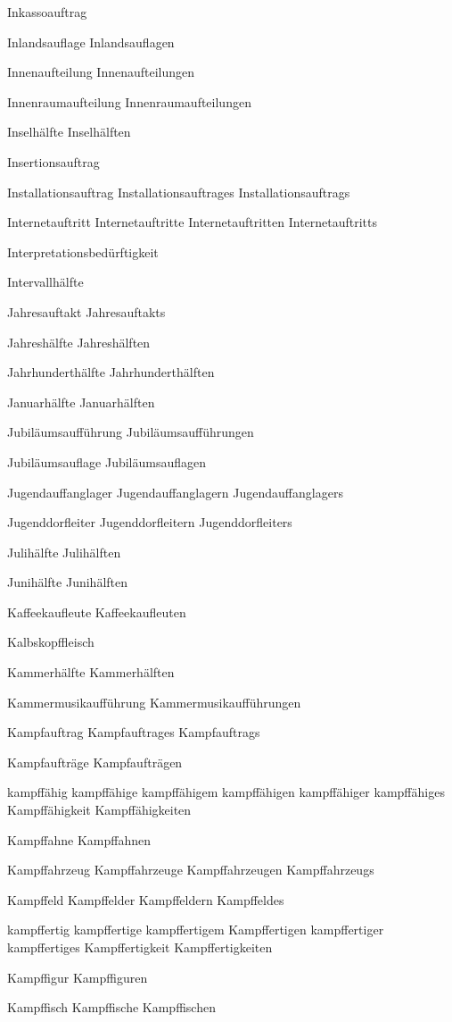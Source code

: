 Inkassoauftrag

Inlandsauflage
Inlandsauflagen

Innenaufteilung
Innenaufteilungen

Innenraumaufteilung
Innenraumaufteilungen

Inselhälfte
Inselhälften

Insertionsauftrag

Installationsauftrag
Installationsauftrages
Installationsauftrags

Internetauftritt
Internetauftritte
Internetauftritten
Internetauftritts

Interpretationsbedürftigkeit

Intervallhälfte

Jahresauftakt
Jahresauftakts

Jahreshälfte
Jahreshälften

Jahrhunderthälfte
Jahrhunderthälften

Januarhälfte
Januarhälften

Jubiläumsaufführung
Jubiläumsaufführungen

Jubiläumsauflage
Jubiläumsauflagen

Jugendauffanglager
Jugendauffanglagern
Jugendauffanglagers

Jugenddorfleiter
Jugenddorfleitern
Jugenddorfleiters

Julihälfte
Julihälften

Junihälfte
Junihälften

Kaffeekaufleute
Kaffeekaufleuten

Kalbskopffleisch

Kammerhälfte
Kammerhälften

Kammermusikaufführung
Kammermusikaufführungen

Kampfauftrag
Kampfauftrages
Kampfauftrags

Kampfaufträge
Kampfaufträgen

kampffähig
kampffähige
kampffähigem
kampffähigen
kampffähiger
kampffähiges
Kampffähigkeit
Kampffähigkeiten

Kampffahne
Kampffahnen

Kampffahrzeug
Kampffahrzeuge
Kampffahrzeugen
Kampffahrzeugs

Kampffeld
Kampffelder
Kampffeldern
Kampffeldes

kampffertig
kampffertige
kampffertigem
Kampffertigen
kampffertiger
kampffertiges
Kampffertigkeit
Kampffertigkeiten

Kampffigur
Kampffiguren

Kampffisch
Kampffische
Kampffischen

